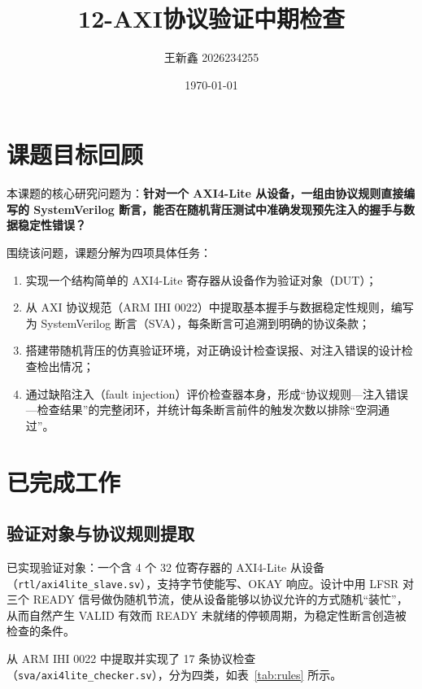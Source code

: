 \documentclass[12pt, a4paper, oneside]{ctexart}
\title{\textbf{12-AXI协议验证中期检查}}
\author{王新鑫 2026234255}
\date{\today}
\begin{document}
\maketitle

\section{课题目标回顾}

本课题的核心研究问题为：\textbf{针对一个 AXI4-Lite 从设备，一组由协议规则直接编写的 SystemVerilog 断言，能否在随机背压测试中准确发现预先注入的握手与数据稳定性错误？}

围绕该问题，课题分解为四项具体任务：
\begin{enumerate}
  \item 实现一个结构简单的 AXI4-Lite 寄存器从设备作为验证对象（DUT）；
  \item 从 AXI 协议规范（ARM IHI 0022）中提取基本握手与数据稳定性规则，编写为 SystemVerilog 断言（SVA），每条断言可追溯到明确的协议条款；
  \item 搭建带随机背压的仿真验证环境，对正确设计检查误报、对注入错误的设计检查检出情况；
  \item 通过缺陷注入（fault injection）评价检查器本身，形成``协议规则---注入错误---检查结果''的完整闭环，并统计每条断言前件的触发次数以排除``空洞通过''。
\end{enumerate}

\section{已完成工作}

\subsection{验证对象与协议规则提取}

已实现验证对象：一个含 4 个 32 位寄存器的 AXI4-Lite 从设备（\texttt{rtl/axi4lite\_slave.sv}），支持字节使能写、OKAY 响应。设计中用 LFSR 对三个 READY 信号做伪随机节流，使从设备能够以协议允许的方式随机``装忙''，从而自然产生 VALID 有效而 READY 未就绪的停顿周期，为稳定性断言创造被检查的条件。

从 ARM IHI 0022 中提取并实现了 17 条协议检查（\texttt{sva/axi4lite\_checker.sv}），分为四类，如表~\ref{tab:rules} 所示。
\end{document}

